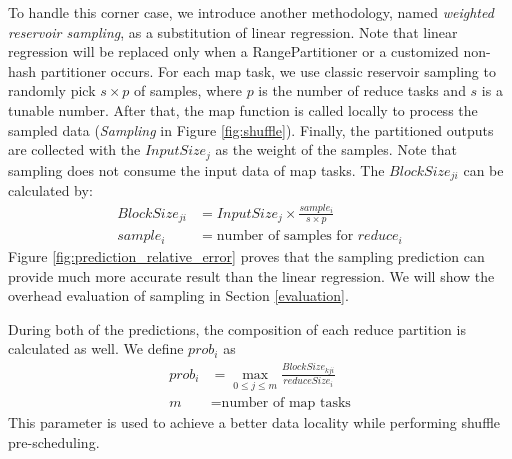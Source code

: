 To handle this corner case, we introduce another methodology, named \emph{weighted reservoir sampling}, as a substitution of linear regression. 
Note that linear regression will be replaced only when a RangePartitioner or a customized non-hash partitioner occurs. 
For each map task, we use classic reservoir sampling to randomly pick $s \times p$ of samples, where $p$ is the number of reduce tasks and $s$ is a tunable number. 
After that, the map function is called locally to process the sampled data (\textit{Sampling} in Figure \ref{fig:shuffle}). 
Finally, the partitioned outputs are collected with the $InputSize_j$ as the weight of the samples.
Note that sampling does not consume the input data of map tasks. 
The $BlockSize_{ji}$ can be calculated by:
\begin{equation}
\label{equationsample}
\begin{aligned}
	BlockSize_{ji} &= {{InputSize_j \times \frac{sample_i}{s \times p}}} \\
	sample_i &= \text{number of samples for $reduce_i$}
\end{aligned}
\end{equation}
{\color{blue}
Figure \ref{fig:prediction_relative_error} proves that the sampling prediction can provide much more accurate result than the linear regression. 
We will show the overhead evaluation of sampling in Section \ref{evaluation}. 
}

During both of the predictions, the composition of each reduce partition is calculated as well. We define $prob_i$ as
\begin{equation}
\label{equationprob}
\begin{aligned}
	prob_i &= \max_{0 \leq j \leq m} \frac{BlockSize_{kji}}{reduceSize_i} \\
    m &= \text{number of map tasks}
\end{aligned}
\end{equation}
This parameter is used to achieve a better data locality while performing shuffle pre-scheduling. 


